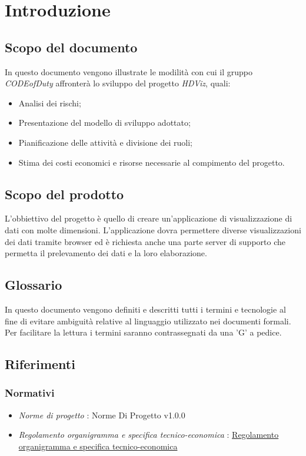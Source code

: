 \section{Introduzione}
\subsection{Scopo del documento}
In questo documento vengono illustrate le modilità con cui il gruppo \emph{CODEofDuty} affronterà lo sviluppo del progetto \emph{HDViz}, quali:
\begin{itemize}
    \item Analisi dei rischi;
    \item Presentazione del modello di sviluppo adottato;
    \item Pianificazione delle attività e divisione dei ruoli;
    \item Stima dei costi economici e risorse necessarie al compimento del progetto.
\end{itemize}
\subsection{Scopo del prodotto}
L'obbiettivo del progetto è quello di creare un'applicazione di visualizzazione di dati con molte dimensioni. L'applicazione dovra permettere diverse visualizzazioni dei dati tramite browser ed è richiesta anche una parte server di supporto che permetta il prelevamento dei dati e la loro elaborazione.
\subsection{Glossario}
In questo documento vengono definiti e descritti tutti i termini e tecnologie al fine di evitare ambiguità relative al linguaggio utilizzato nei documenti formali. Per facilitare la lettura i termini saranno contrassegnati da una 'G' a pedice.  
\subsection{Riferimenti}
\subsubsection{Normativi}
\begin{itemize}
    \item \emph{Norme di progetto} : Norme Di Progetto v1.0.0
    \item \emph{Regolamento organigramma e specifica tecnico-economica} : \href{https://www.math.unipd.it/~tullio/IS-1/2020/Progetto/RO.html}{Regolamento organigramma e specifica tecnico-economica}
\end{itemize}
